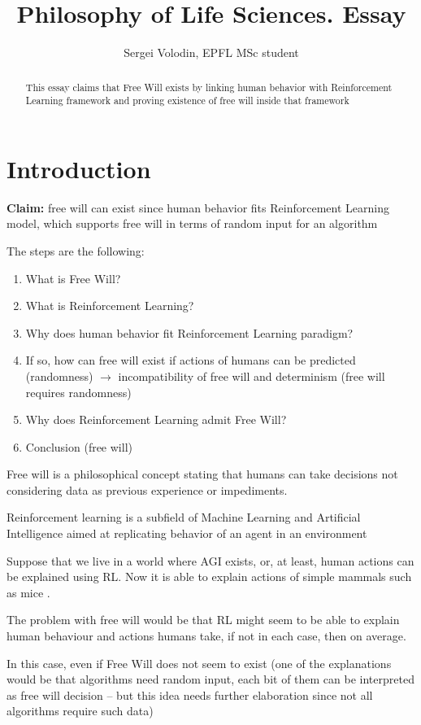 \documentclass[a4,left=1cm]{article}
\title{Philosophy of Life Sciences. Essay}
\author{Sergei Volodin, EPFL MSc student}
\begin{document}
\maketitle

\begin{abstract}
This essay claims that Free Will exists by linking human behavior with Reinforcement Learning framework and proving existence of free will inside that framework
\end{abstract}

\section{Introduction}
{\bf Claim:} free will can exist since human behavior fits Reinforcement Learning model, which supports free will in terms of random input for an algorithm

The steps are the following:
\begin{enumerate}
	\item What is Free Will?
	\item What is Reinforcement Learning?
	\item Why does human behavior fit Reinforcement Learning paradigm?
	\item If so, how can free will exist if actions of humans can be predicted (randomness) $\rightarrow$ incompatibility of free will and determinism (free will requires randomness)
	\item Why does Reinforcement Learning admit Free Will?
	\item Conclusion (free will)
\end{enumerate}

Free will is a philosophical concept stating that humans can take decisions not considering data as previous experience or impediments.


Reinforcement learning is a subfield of Machine Learning and Artificial Intelligence aimed at replicating behavior of an agent in an environment \cite{sutton}

Suppose that we live in a world where AGI exists, or, at least, human actions can be explained using RL. Now it is able to explain actions of simple mammals such as mice \cite{oist}.

The problem with free will would be that RL might seem to be able to explain human behaviour and actions humans take, if not in each case, then on average.

In this case, even if Free Will does not seem to exist (one of the explanations would be that algorithms need random input, each bit of them can be interpreted as free will decision -- but this idea needs further elaboration since not all algorithms require such data)
\end{document}
